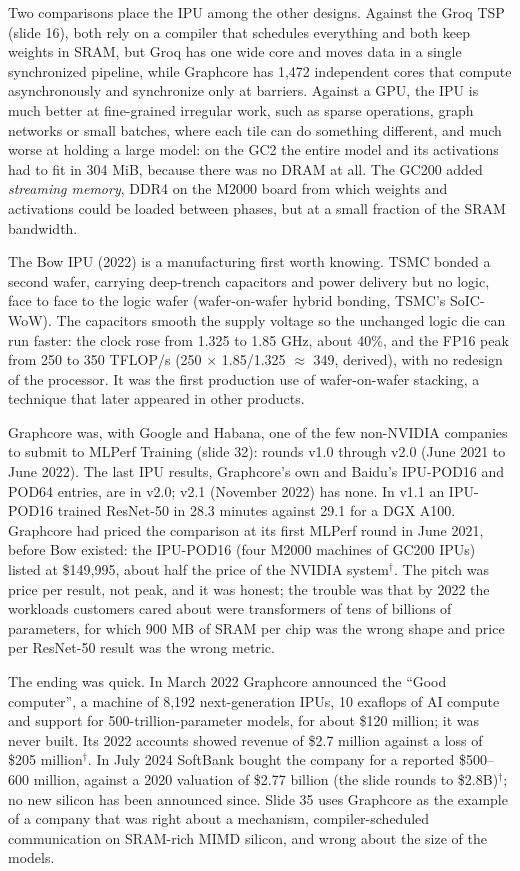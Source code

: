\documentclass[11pt,letterpaper]{article}
\begin{document}
Two comparisons place the IPU among the other designs. Against the Groq TSP (slide 16), both rely on a compiler that schedules everything and both keep weights in SRAM, but Groq has one wide core and moves data in a single synchronized pipeline, while Graphcore has 1{,}472 independent cores that compute asynchronously and synchronize only at barriers. Against a GPU, the IPU is much better at fine-grained irregular work, such as sparse operations, graph networks or small batches, where each tile can do something different, and much worse at holding a large model: on the GC2 the entire model and its activations had to fit in 304 MiB, because there was no DRAM at all. The GC200 added \emph{streaming memory}, DDR4 on the M2000 board from which weights and activations could be loaded between phases, but at a small fraction of the SRAM bandwidth.

The Bow IPU (2022) is a manufacturing first worth knowing. TSMC bonded a second wafer, carrying deep-trench capacitors and power delivery but no logic, face to face to the logic wafer (wafer-on-wafer hybrid bonding, TSMC's SoIC-WoW). The capacitors smooth the supply voltage so the unchanged logic die can run faster: the clock rose from 1.325 to 1.85 GHz, about 40\%, and the FP16 peak from 250 to 350 TFLOP/s (250 $\times$ 1.85/1.325 $\approx$ 349, derived), with no redesign of the processor. It was the first production use of wafer-on-wafer stacking, a technique that later appeared in other products.

Graphcore was, with Google and Habana, one of the few non-NVIDIA companies to submit to MLPerf Training (slide 32): rounds v1.0 through v2.0 (June 2021 to June 2022). The last IPU results, Graphcore's own and Baidu's IPU-POD16 and POD64 entries, are in v2.0; v2.1 (November 2022) has none. In v1.1 an IPU-POD16 trained ResNet-50 in 28.3 minutes against 29.1 for a DGX A100. Graphcore had priced the comparison at its first MLPerf round in June 2021, before Bow existed: the IPU-POD16 (four M2000 machines of GC200 IPUs) listed at \$149{,}995, about half the price of the NVIDIA system$^\dagger$. The pitch was price per result, not peak, and it was honest; the trouble was that by 2022 the workloads customers cared about were transformers of tens of billions of parameters, for which 900 MB of SRAM per chip was the wrong shape and price per ResNet-50 result was the wrong metric.

The ending was quick. In March 2022 Graphcore announced the ``Good computer'', a machine of 8{,}192 next-generation IPUs, 10 exaflops of AI compute and support for 500-trillion-parameter models, for about \$120 million; it was never built. Its 2022 accounts showed revenue of \$2.7 million against a loss of \$205 million$^\dagger$. In July 2024 SoftBank bought the company for a reported \$500--600 million, against a 2020 valuation of \$2.77 billion (the slide rounds to \$2.8B)$^\dagger$; no new silicon has been announced since. Slide 35 uses Graphcore as the example of a company that was right about a mechanism, compiler-scheduled communication on SRAM-rich MIMD silicon, and wrong about the size of the models.
\end{document}
